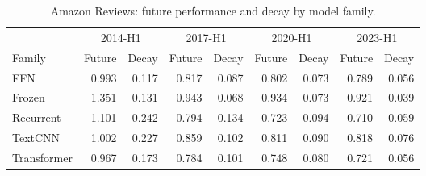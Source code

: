\begin{table}[H]
\centering
\footnotesize
\caption{Amazon Reviews: future performance and decay by model family.}
\label{tab:amazon_reviews_by_family}
\begin{tabular}{l rrrrrrrr}
\toprule
 & \multicolumn{2}{c}{2014-H1} & \multicolumn{2}{c}{2017-H1} & \multicolumn{2}{c}{2020-H1} & \multicolumn{2}{c}{2023-H1} \\
Family & Future & Decay & Future & Decay & Future & Decay & Future & Decay \\
\midrule
FFN & 0.993 & 0.117 & 0.817 & 0.087 & 0.802 & 0.073 & 0.789 & 0.056 \\
Frozen & 1.351 & 0.131 & 0.943 & 0.068 & 0.934 & 0.073 & 0.921 & 0.039 \\
Recurrent & 1.101 & 0.242 & 0.794 & 0.134 & 0.723 & 0.094 & 0.710 & 0.059 \\
TextCNN & 1.002 & 0.227 & 0.859 & 0.102 & 0.811 & 0.090 & 0.818 & 0.076 \\
Transformer & 0.967 & 0.173 & 0.784 & 0.101 & 0.748 & 0.080 & 0.721 & 0.056 \\
\bottomrule
\end{tabular}
\end{table}
